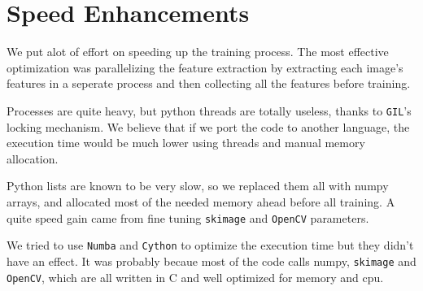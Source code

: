 \section{Speed Enhancements}
We put alot of effort on speeding up the training process.
The most effective optimization was parallelizing the feature extraction by extracting each image's features in a seperate process and then collecting all the features before training.

Processes are quite heavy, but python threads are totally useless, thanks to \texttt{GIL}'s locking mechanism.
We believe that if we port the code to another language, the execution time would be much lower using threads and manual memory allocation.

Python lists are known to be very slow, so we replaced them all with numpy arrays, and allocated most of the needed memory ahead before all training.
A quite speed gain came from fine tuning \texttt{skimage} and \texttt{OpenCV} parameters.

We tried to use \texttt{Numba} and \texttt{Cython} to optimize the execution time but they didn't have an effect.
It was probably becaue most of the code calls numpy, \texttt{skimage} and \texttt{OpenCV}, which are all written in C and well optimized for memory and cpu.